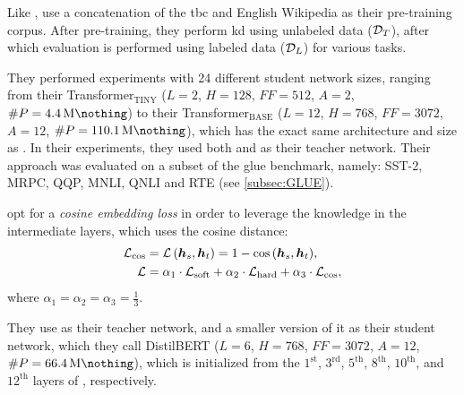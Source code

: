 Like \citet{devlin2018bert}, \citet{turc2019well} use a concatenation of the \gls{tbc} and English Wikipedia as their pre-training corpus. After pre-training, they perform \gls{kd} using unlabeled data ($\mathcal{D}_T$), after which evaluation is performed using labeled data ($\mathcal{D}_L$) for various tasks.

They performed experiments with 24 different student network sizes, ranging from their Transformer$_{\text{TINY}}$ ($L=2$, $H=128$, $FF=512$, $A=2$, $\#P=\SI{4.4}{\mega\nothing}$) to their Transformer$_{\text{BASE}}$ ($L=12$, $H=768$, $FF=3072$, $A=12$, $\#P=\SI{110.1}{\mega\nothing}$), which has the exact same architecture and size as \bertbase. In their experiments, they used both \bertbase and \bertlarge as their teacher network. Their approach was evaluated on a subset of the \gls{glue} benchmark, namely: SST-2, MRPC, QQP, MNLI, QNLI and RTE (see \cref{subsec:GLUE}).


\citet{sanh2019distilbert} opt for a \emph{cosine embedding loss} in order to leverage the knowledge in the intermediate layers, which uses the cosine distance:
\begin{align}
    \label{eq:cosine_embedding_loss}
    \mathcal{L}_{\text{cos}} &= \loss{\hvect_s, \hvect_t} = 1 - \cos{\left( \hvect_s, \hvect_t \right)}, \\
    \mathcal{L} &= \alpha_1 \cdot \mathcal{L}_{\text{soft}} + \alpha_2 \cdot \mathcal{L}_{\text{hard}} + \alpha_3 \cdot \mathcal{L}_{\text{cos}},
\end{align}
where $\alpha_1 = \alpha_2 = \alpha_3 = \frac{1}{3}$. 

They use \bertbase as their teacher network, and a smaller version of it as their student network, which they call DistilBERT ($L=6$, $H=768$, $FF = 3072$, $A=12$, $\#P=\SI{66.4}{\mega\nothing}$), which is initialized from the $1^{\text{st}}$, $3^{\text{rd}}$, $5^{\text{th}}$, $8^{\text{th}}$, $10^{\text{th}}$, and $12^{\text{th}}$ layers of \bertbase, respectively.


